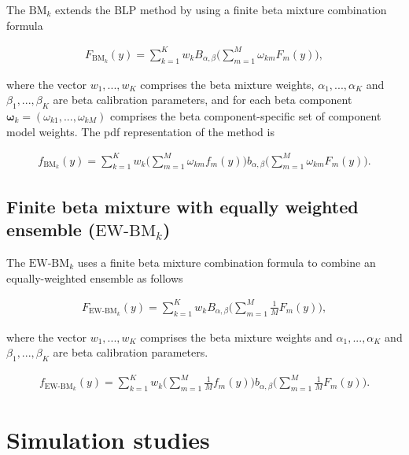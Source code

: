 \documentclass[
]{article}
\begin{document}
The \(\text{BM}_k\) extends the BLP method by using a finite beta
mixture combination formula

\begin{align}
F_{\text{BM}_k}(y)=\sum_{k=1}^K w_kB_{\alpha,\beta}\Big(\sum_{m=1}^M \omega_{km} F_m(y)\Big),
\end{align}

where the vector \(w_1,..., w_K\) comprises the beta mixture weights,
\(\alpha_1,..., \alpha_K\) and \(\beta_1,..., \beta_K\) are beta
calibration parameters, and for each beta component
\(\boldsymbol{\omega}_k=(\omega_{k1},..., \omega_{kM})\) comprises the
beta component-specific set of component model weights. The pdf
representation of the method is

\begin{align}
f_{\text{BM}_k}(y)=\sum_{k=1}^K w_k(\sum_{m=1}^M \omega_{km} f_m(y)\Big)b_{\alpha,\beta}\Big(\sum_{m=1}^M \omega_{km} F_m(y)\Big).
\end{align}

\hypertarget{finite-beta-mixture-with-equally-weighted-ensemble-textew-bm_k}{%
\subsection{\texorpdfstring{Finite beta mixture with equally weighted
ensemble
(\(\text{EW-BM}_k\))}{Finite beta mixture with equally weighted ensemble (\textbackslash text\{EW-BM\}\_k)}}\label{finite-beta-mixture-with-equally-weighted-ensemble-textew-bm_k}}

The \(\text{EW-BM}_k\) uses a finite beta mixture combination formula to
combine an equally-weighted ensemble as follows

\begin{align}
F_{\text{EW-BM}_k}(y)=\sum_{k=1}^K w_kB_{\alpha,\beta}\Big(\sum_{m=1}^M \frac{1}{M} F_m(y)\Big),
\end{align}

where the vector \(w_1,..., w_K\) comprises the beta mixture weights and
\(\alpha_1,..., \alpha_K\) and \(\beta_1,..., \beta_K\) are beta
calibration parameters.

\begin{align}
f_{\text{EW-BM}_k}(y)=\sum_{k=1}^K w_k(\sum_{m=1}^M \frac{1}{M} f_m(y)\Big)b_{\alpha,\beta}\Big(\sum_{m=1}^M \frac{1}{M} F_m(y)\Big).
\end{align}

\hypertarget{simulation-studies}{%
\section{Simulation studies}\label{simulation-studies}}
\end{document}
